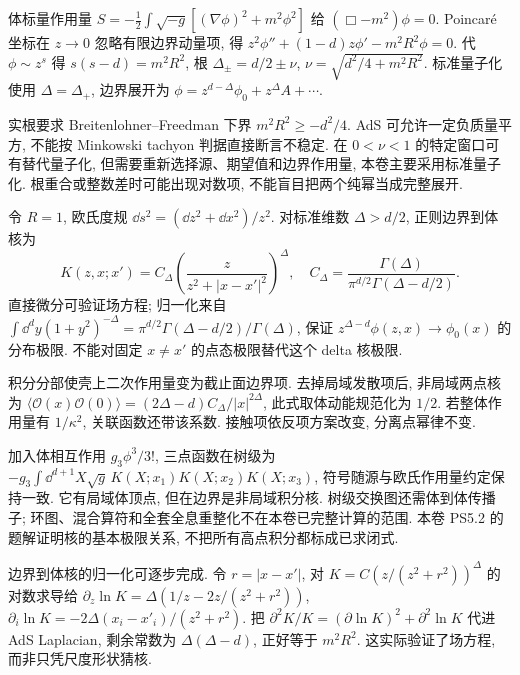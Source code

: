 \label{ch:correlator}
体标量作用量 $S=-\frac12\int\sqrt{-g}[(\nabla\phi)^2+m^2\phi^2]$ 给 $(\Box-m^2)\phi=0$. Poincaré 坐标在 $z\to0$ 忽略有限边界动量项, 得 $z^2\phi''+(1-d)z\phi'-m^2R^2\phi=0$. 代 $\phi\sim z^s$ 得 $s(s-d)=m^2R^2$, 根 $\Delta_\pm=d/2\pm\nu$, $\nu=\sqrt{d^2/4+m^2R^2}$. 标准量子化使用 $\Delta=\Delta_+$, 边界展开为 $\phi=z^{d-\Delta}\phi_0+z^\Delta A+\cdots$.

实根要求 Breitenlohner--Freedman 下界 $m^2R^2\ge-d^2/4$. AdS 可允许一定负质量平方, 不能按 Minkowski tachyon 判据直接断言不稳定. 在 $0<\nu<1$ 的特定窗口可有替代量子化, 但需要重新选择源、期望值和边界作用量, 本卷主要采用标准量子化. 根重合或整数差时可能出现对数项, 不能盲目把两个纯幂当成完整展开.

令 $R=1$, 欧氏度规 $\dd s^2=(\dd z^2+\dd x^2)/z^2$. 对标准维数 $\Delta>d/2$, 正则边界到体核为
\begin{equation}\label{eq:K}
K(z,x;x')=C_\Delta\left(\frac z{z^2+|x-x'|^2}\right)^\Delta,
\quad C_\Delta=\frac{\Gamma(\Delta)}{\pi^{d/2}\Gamma(\Delta-d/2)}.
\end{equation}
直接微分可验证场方程; 归一化来自 $\int\dd^dy(1+y^2)^{-\Delta}=\pi^{d/2}\Gamma(\Delta-d/2)/\Gamma(\Delta)$, 保证 $z^{\Delta-d}\phi(z,x)\to\phi_0(x)$ 的分布极限. 不能对固定 $x\ne x'$ 的点态极限替代这个 delta 核极限.

积分分部使壳上二次作用量变为截止面边界项. 去掉局域发散项后, 非局域两点核为
$\langle\mathcal O(x)\mathcal O(0)\rangle=(2\Delta-d)C_\Delta/|x|^{2\Delta}$, 此式取体动能规范化为 $1/2$. 若整体作用量有 $1/\kappa^2$, 关联函数还带该系数. 接触项依反项方案改变, 分离点幂律不变.

加入体相互作用 $g_3\phi^3/3!$, 三点函数在树级为 $-g_3\int\dd^{d+1}X\sqrt g\,K(X;x_1)K(X;x_2)K(X;x_3)$, 符号随源与欧氏作用量约定保持一致. 它有局域体顶点, 但在边界是非局域积分核. 树级交换图还需体到体传播子; 环图、混合算符和全套全息重整化不在本卷已完整计算的范围. 本卷 PS5.2 的题解证明核的基本极限关系, 不把所有高点积分都标成已求闭式.

边界到体核的归一化可逐步完成. 令 $r=|x-x'|$, 对 $K=C(z/(z^2+r^2))^\Delta$ 的对数求导给 $\partial_z\ln K=\Delta(1/z-2z/(z^2+r^2))$, $\partial_i\ln K=-2\Delta(x_i-x'_i)/(z^2+r^2)$. 把 $\partial^2K/K=(\partial\ln K)^2+\partial^2\ln K$ 代进 AdS Laplacian, 剩余常数为 $\Delta(\Delta-d)$, 正好等于 $m^2R^2$. 这实际验证了场方程, 而非只凭尺度形状猜核.


